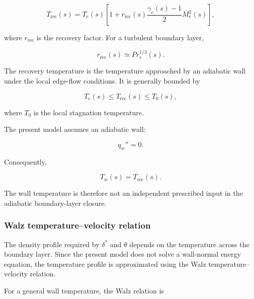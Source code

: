 \begin{equation}
    \boxed{
    T_{\mathrm{rec}}(s)
    =
    T_e(s)
    \left[
        1+
        r_{\mathrm{rec}}(s)
        \frac{\gamma_e(s)-1}{2}
        M_e^2(s)
    \right]
    },
    \label{eq:recovery_temperature}
\end{equation}

where \(r_{\mathrm{rec}}\) is the recovery factor. For a turbulent boundary
layer,

\begin{equation}
    \boxed{
    r_{\mathrm{rec}}(s)
    \simeq
    Pr_e^{1/3}(s)
    }.
    \label{eq:turbulent_recovery_factor}
\end{equation}

The recovery temperature is the temperature approached by an adiabatic wall
under the local edge-flow conditions. It is generally bounded by

\begin{equation}
    T_e(s)
    \leq
    T_{\mathrm{rec}}(s)
    \leq
    T_0(s),
\end{equation}

where \(T_0\) is the local stagnation temperature.

The present model assumes an adiabatic wall:

\begin{equation}
    q_w''=0.
\end{equation}

Consequently,

\begin{equation}
    \boxed{
    T_w(s)=T_{\mathrm{rec}}(s)
    }.
    \label{eq:quick_adiabatic_wall_temperature}
\end{equation}

The wall temperature is therefore not an independent prescribed input in the
adiabatic boundary-layer closure.

\subsubsection{Walz temperature--velocity relation}

The density profile required by \(\delta^*\) and \(\theta\) depends on the
temperature across the boundary layer. Since the present model does not solve
a wall-normal energy equation, the temperature profile is approximated using
the Walz temperature--velocity relation.

For a general wall temperature, the Walz relation is

